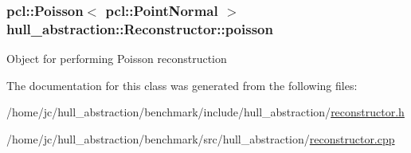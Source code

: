 \subsubsection[{\texorpdfstring{poisson}{poisson}}]{\setlength{\rightskip}{0pt plus 5cm}pcl\+::\+Poisson$<$ pcl\+::\+Point\+Normal $>$ hull\+\_\+abstraction\+::\+Reconstructor\+::poisson\hspace{0.3cm}{\ttfamily [private]}}\hypertarget{classhull__abstraction_1_1_reconstructor_a60dfa765833af8d05f1426be0e96adb0}{}\label{classhull__abstraction_1_1_reconstructor_a60dfa765833af8d05f1426be0e96adb0}
Object for performing Poisson reconstruction 

The documentation for this class was generated from the following files\+:\begin{DoxyCompactItemize}
\item 
/home/jc/hull\+\_\+abstraction/benchmark/include/hull\+\_\+abstraction/\hyperlink{benchmark_2include_2hull__abstraction_2reconstructor_8h}{reconstructor.\+h}\item 
/home/jc/hull\+\_\+abstraction/benchmark/src/hull\+\_\+abstraction/\hyperlink{benchmark_2src_2hull__abstraction_2reconstructor_8cpp}{reconstructor.\+cpp}\end{DoxyCompactItemize}

